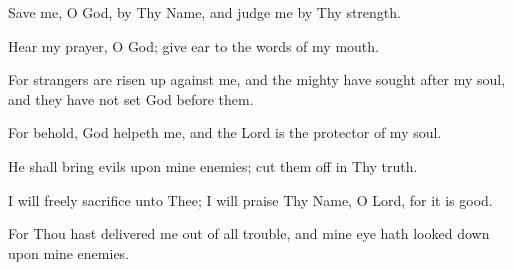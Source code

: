 Save me, O God, by Thy Name, and judge me by Thy strength.

Hear my prayer, O God; give ear to the words of my mouth.

For strangers are risen up against me, and the mighty have sought after my soul, and they have not set God before them.

For behold, God helpeth me, and the Lord is the protector of my soul.

He shall bring evils upon mine enemies; cut them off in Thy truth.

I will freely sacrifice unto Thee; I will praise Thy Name, O Lord, for it is good.

For Thou hast delivered me out of all trouble, and mine eye hath looked down upon mine enemies.

